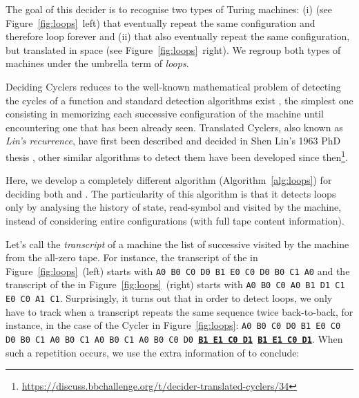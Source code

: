 
The goal of this decider is to recognise two types of Turing machines: (i) \textit{\cyclers} (see Figure~\ref{fig:loops}~left) that eventually repeat the same configuration and therefore loop forever and (ii) \textit{\TCs} that also eventually repeat the same configuration, but translated in space (see Figure~\ref{fig:loops}~right). We regroup both types of machines under the umbrella term of \textit{loops}.

Deciding Cyclers reduces to the well-known mathematical problem of detecting the cycles of a function and standard detection algorithms exist \cite{wiki:Cycle_detection}, the simplest one consisting in memorizing each successive configuration of the machine until encountering one that has been already seen. Translated Cyclers, also known as \textit{Lin's recurrence}, have first been described and decided in Shen Lin's 1963 PhD thesis \cite{Lin1963}, other similar algorithms to detect them have been developed since then\footnote{\url{https://discuss.bbchallenge.org/t/decider-translated-cyclers/34}}.

Here, we develop a completely different algorithm (Algorithm~\ref{alg:loops}) for deciding both \cyclers and \TCs. The particularity of this algorithm is that it detects loops only by analysing the history of state, read-symbol and \headposs visited by the machine, instead of considering entire configurations (\ie with full tape content information).

Let's call the \textit{transcript} of a machine the list of successive \ssps visited by the machine from the all-zero tape. For instance, the transcript of the \cycler in Figure~\ref{fig:loops}~(left) starts with \texttt{A0 B0 C0 D0 B1 E0 C0 D0 B0 C1 A0} and the transcript of the \TC in Figure~\ref{fig:loops}~(right) starts with \texttt{A0 B0 C0 A0 B1 D1 C1 E0 C0 A1 C1}. Surprisingly, it turns out that in order to detect loops, we only have to track when a transcript repeats the same sequence twice back-to-back, for instance, in the case of the Cycler in Figure~\ref{fig:loops}: \texttt{A0 B0 C0 D0 B1 E0 C0 D0 B0 C1 A0 B0 C1 A0 B0 C1 A0 B0 C0 D0 \textbf{\underline{B1 E1 C0 D1}} \textbf{\underline{B1 E1 C0 D1}}}. When such a repetition occurs, we use the extra information of \headpos to conclude:

